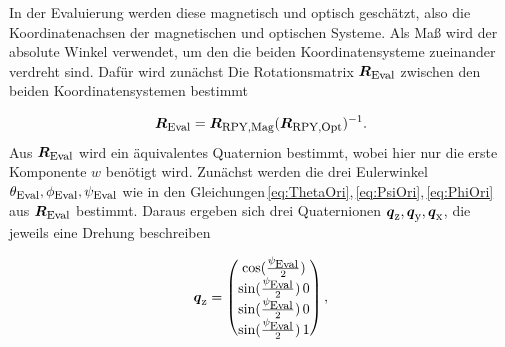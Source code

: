 In der Evaluierung werden diese magnetisch und optisch geschätzt, also die Koordinatenachsen der magnetischen und optischen Systeme. Als Maß wird der absolute Winkel verwendet, um den die beiden Koordinatensysteme zueinander verdreht sind. Dafür wird zunächst Die Rotationsmatrix $\mbox{\boldmath ${R}$}_{\textrm{\footnotesize{Eval}}}$ zwischen den beiden Koordinatensystemen bestimmt

\begin{equation}
    \mbox{\boldmath ${R}$}_{\textrm{\footnotesize{Eval}}} = \mbox{\boldmath ${R}$}_{\textrm{\footnotesize{RPY,Mag}}} (\mbox{\boldmath ${R}$}_{\textrm{\footnotesize{RPY,Opt}}})^{-1}.
\end{equation}
Aus $\mbox{\boldmath ${R}$}_{\textrm{\footnotesize{Eval}}}$ wird ein äquivalentes Quaternion bestimmt, wobei hier nur die erste Komponente $w$ benötigt wird. Zunächst werden die drei Eulerwinkel $\theta_{\textrm{\footnotesize{Eval}}},\phi_{\textrm{\footnotesize{Eval}}},\psi_{\textrm{\footnotesize{Eval}}}$ wie in den Gleichungen\,\ref{eq:ThetaOri},\,\ref{eq:PsiOri},\,\ref{eq:PhiOri} aus $\mbox{\boldmath ${R}$}_{\textrm{\footnotesize{Eval}}}$ bestimmt. Daraus ergeben sich drei Quaternionen $\mbox{\boldmath ${q}$}_{\textrm{\footnotesize{z}}},\mbox{\boldmath ${q}$}_{\textrm{\footnotesize{y}}},\mbox{\boldmath ${q}$}_{\textrm{\footnotesize{x}}}$, die jeweils eine Drehung beschreiben

\begin{equation}
  \mbox{\boldmath ${q}$}_{\textrm{\footnotesize{z}}} = \begin{pmatrix}
    \cos(\frac{\psi_{\textrm{\footnotesize{Eval}}}}{2}) \\
    \sin(\frac{\psi_{\textrm{\footnotesize{Eval}}}}{2})\,0 \\
    \sin(\frac{\psi_{\textrm{\footnotesize{Eval}}}}{2})\,0 \\
    \sin(\frac{\psi_{\textrm{\footnotesize{Eval}}}}{2})\,1 
\end{pmatrix},
\label{eq:quatZ}
\end{equation}

